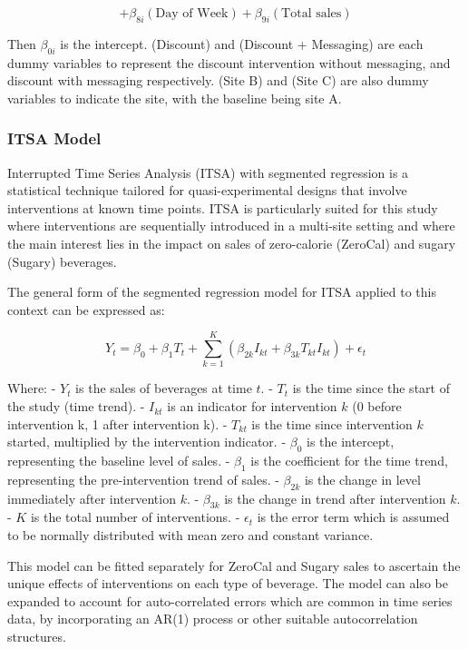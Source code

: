\documentclass[
]{article}
\begin{document}
\[
+ \beta_{8i} (\text{Day of Week})+ \beta_{9i} (\text{Total sales})
\]

Then \(\beta_{0i}\) is the intercept. (Discount) and (Discount +
Messaging) are each dummy variables to represent the discount
intervention without messaging, and discount with messaging
respectively. (Site B) and (Site C) are also dummy variables to indicate
the site, with the baseline being site A.

\hypertarget{itsa-model}{%
\subsubsection{ITSA Model}\label{itsa-model}}

Interrupted Time Series Analysis (ITSA) with segmented regression is a
statistical technique tailored for quasi-experimental designs that
involve interventions at known time points. ITSA is particularly suited
for this study where interventions are sequentially introduced in a
multi-site setting and where the main interest lies in the impact on
sales of zero-calorie (ZeroCal) and sugary (Sugary) beverages.

The general form of the segmented regression model for ITSA applied to
this context can be expressed as:

\[Y_t = \beta_0 + \beta_1 T_t + \sum_{k=1}^{K} (\beta_{2k} I_{kt} + \beta_{3k} T_{kt} I_{kt}) + \epsilon_t \]

Where: - \(Y_t\) is the sales of beverages at time \(t\). - \(T_t\) is
the time since the start of the study (time trend). - \(I_{kt}\) is an
indicator for intervention \(k\) (0 before intervention k, 1 after
intervention k). - \(T_{kt}\) is the time since intervention \(k\)
started, multiplied by the intervention indicator. - \(\beta_0\) is the
intercept, representing the baseline level of sales. - \(\beta_1\) is
the coefficient for the time trend, representing the pre-intervention
trend of sales. - \(\beta_{2k}\) is the change in level immediately
after intervention \(k\). - \(\beta_{3k}\) is the change in trend after
intervention \(k\). - \(K\) is the total number of interventions. -
\(\epsilon_t\) is the error term which is assumed to be normally
distributed with mean zero and constant variance.

This model can be fitted separately for ZeroCal and Sugary sales to
ascertain the unique effects of interventions on each type of beverage.
The model can also be expanded to account for auto-correlated errors
which are common in time series data, by incorporating an AR(1) process
or other suitable autocorrelation structures.
\end{document}
